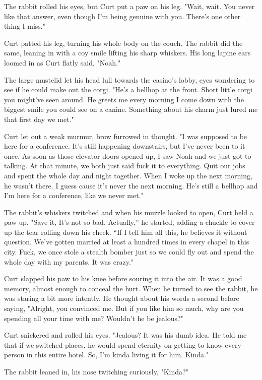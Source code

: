 The rabbit rolled his eyes, but Curt put a paw on his leg. "Wait, wait. You never like that answer, even though I'm being genuine with you. There's one other thing I miss."

Curt patted his leg, turning his whole body on the couch. The rabbit did the same, leaning in with a coy smile lifting his sharp whiskers. His long lapine ears loomed in as Curt flatly said, "Noah."

The large mustelid let his head lull towards the casino's lobby, eyes wandering to see if he could make out the corgi. "He's a bellhop at the front. Short little corgi you might've seen around. He greets me every morning I come down with the biggest smile you could see on a canine. Something about his charm just lured me that first day we met."

Curt let out a weak murmur, brow furrowed in thought. "I was supposed to be here for a conference. It's still happening downstairs, but I've never been to it once. As soon as those elevator doors opened up, I saw Noah and we just got to talking. At that minute, we both just said fuck it to everything. Quit our jobs and spent the whole day and night together. When I woke up the next morning, he wasn't there. I guess cause it's never the next morning. He's still a bellhop and I'm here for a conference, like we never met."

The rabbit's whiskers twitched and when his muzzle looked to open, Curt held a paw up. "Save it, It's not so bad. Actually,'' he started, adding a chuckle to cover up the tear rolling down his cheek. ``If I tell him all this, he believes it without question. We've gotten married at least a hundred times in every chapel in this city. Fuck, we once stole a stealth bomber just so we could fly out and spend the whole day with my parents. It was crazy."

Curt slapped his paw to his knee before souring it into the air. It was a good memory, almost enough to conceal the hurt. When he turned to see the rabbit, he was staring a bit more intently. He thought about his words a second before saying, "Alright, you convinced me. But if you like him so much, why are you spending all your time with me? Wouldn't he be jealous?"

Curt snickered and rolled his eyes. "Jealous? It was his dumb idea. He told me that if we switched places, he would spend eternity on getting to know every person in this entire hotel. So, I'm kinda living it for him. Kinda."

The rabbit leaned in, his nose twitching curiously, "Kinda?"

